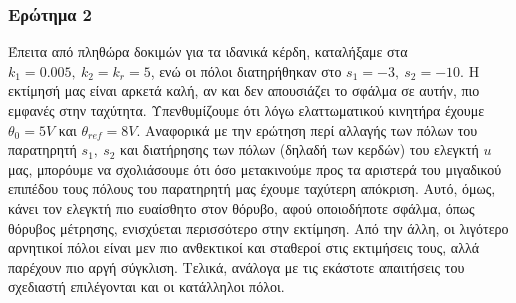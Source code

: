 \subsubsection{Ερώτημα 2}
Έπειτα από πληθώρα δοκιμών για τα ιδανικά κέρδη, καταλήξαμε στα $k_1 = 0.005,\ k_2 = k_r = 5$, ενώ οι πόλοι διατηρήθηκαν στο $s_1 = -3,\ s_2 = -10$. Η εκτίμησή μας είναι αρκετά καλή, αν και δεν απουσιάζει το σφάλμα σε αυτήν, πιο εμφανές στην ταχύτητα. Υπενθυμίζουμε ότι λόγω ελαττωματικού κινητήρα έχουμε $θ_0 = 5V$ και $θ_{ref} = 8V$. Αναφορικά με την ερώτηση περί αλλαγής των πόλων του παρατηρητή $s_1,\ s_2$ και διατήρησης των πόλων (δηλαδή των κερδών) του ελεγκτή $u$ μας, μπορόυμε να σχολιάσουμε ότι όσο μετακινούμε προς τα αριστερά του μιγαδικού επιπέδου τους πόλους του παρατηρητή μας έχουμε ταχύτερη απόκριση. Αυτό, όμως, κάνει τον ελεγκτή πιο ευαίσθητο στον θόρυβο, αφού οποιοδήποτε σφάλμα, όπως θόρυβος μέτρησης, ενισχύεται περισσότερο στην εκτίμηση. Από την άλλη, οι λιγότερο αρνητικοί πόλοι είναι μεν πιο ανθεκτικοί και σταθεροί στις εκτιμήσεις τους, αλλά παρέχουν πιο αργή σύγκλιση. Τελικά, ανάλογα με τις εκάστοτε απαιτήσεις του σχεδιαστή επιλέγονται και οι κατάλληλοι πόλοι.

